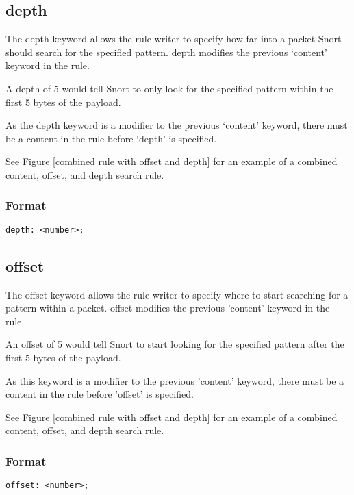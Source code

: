 \documentclass[english]{report}
\begin{document}
\subsection{depth\label{sub:depth}}

The depth keyword allows the rule writer to specify how far into a packet Snort
should search for the specified pattern.  depth modifies the previous `content'
keyword in the rule.

A depth of 5 would tell Snort to only look for the specified pattern
within the first 5 bytes of the payload.

As the depth keyword is a modifier to the previous `content' keyword, there
must be a content in the rule before `depth' is specified.

See Figure \ref{combined rule with offset and depth} for an example of a
combined content, offset, and depth search rule.

\subsubsection{Format}

\begin{verbatim}
depth: <number>;
\end{verbatim}

\subsection{offset\label{sub:offset}}

The offset keyword allows the rule writer to specify where to start searching
for a pattern within a packet.  offset modifies the previous 'content' keyword
in the rule.

An offset of 5 would tell Snort to start looking for the specified pattern
after the first 5 bytes of the payload.

As this keyword is a modifier to the previous 'content' keyword, there must be
a content in the rule before 'offset' is specified.

See Figure \ref{combined rule with offset and depth} for an example of a
combined content, offset, and depth search rule.

\subsubsection{Format}

\begin{verbatim}
offset: <number>;
\end{verbatim}
\end{document}
